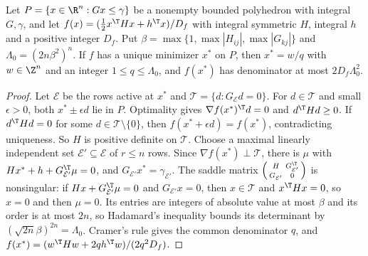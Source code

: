 \begin{lemma}\label{lem:cv-height}
Let $P=\{x\in\R^n:Gx\le\gamma\}$ be a nonempty bounded polyhedron with
integral $G,\gamma$, and let $f(x)=(\frac12x^{\T}Hx+h^{\T}x)/D_f$ with
integral symmetric $H$, integral $h$ and a positive integer $D_f$. Put
$\beta=\max\{1,\max|H_{ij}|,\max|G_{kj}|\}$ and
$\Lambda_0=(2n\beta^2)^n$. If $f$ has a unique minimizer $x^*$ on $P$, then
$x^*=w/q$ with $w\in\Z^n$ and an integer $1\le q\le\Lambda_0$, and $f(x^*)$ has
denominator at most $2D_f\Lambda_0^2$.
\end{lemma}

\begin{proof}
Let $\mathcal E$ be the rows active at $x^*$ and
$\mathcal T=\{d:G_{\mathcal E}d=0\}$. For $d\in\mathcal T$ and small
$\epsilon>0$, both $x^*\pm\epsilon d$ lie in $P$. Optimality gives
$\nabla f(x^*)^{\T}d=0$ and $d^{\T}Hd\ge0$. If
$d^{\T}Hd=0$ for some $d\in\mathcal T\setminus\{0\}$, then
$f(x^*+\epsilon d)=f(x^*)$, contradicting uniqueness. So $H$ is positive
definite on $\mathcal T$. Choose a maximal linearly independent set
$\mathcal E'\subseteq\mathcal E$ of $r\le n$ rows. Since
$\nabla f(x^*)\perp\mathcal T$, there is $\mu$ with
$Hx^*+h+G_{\mathcal E'}^{\T}\mu=0$, and $G_{\mathcal E'}x^*=\gamma_{\mathcal E'}$.
The saddle matrix
$\left(\begin{smallmatrix}H&G_{\mathcal E'}^{\T}\\G_{\mathcal E'}&0\end{smallmatrix}\right)$
is nonsingular: if $Hx+G_{\mathcal E'}^{\T}\mu=0$ and $G_{\mathcal E'}x=0$,
then $x\in\mathcal T$ and $x^{\T}Hx=0$, so $x=0$ and then $\mu=0$. Its
entries are integers of absolute value at most $\beta$ and its order is at most
$2n$, so Hadamard's inequality bounds its determinant by
$(\sqrt{2n}\beta)^{2n}=\Lambda_0$. Cramer's rule gives the common denominator
$q$, and $f(x^*)=(w^{\T}Hw+2qh^{\T}w)/(2q^2D_f)$.
\end{proof}

